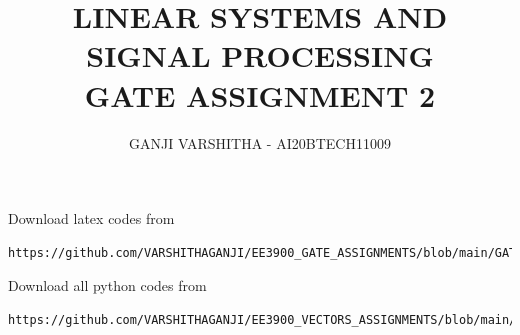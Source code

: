 \documentclass[journal,12pt,twocolumn]{IEEEtran}
\begin{document}
\let\vec\mathbf
\renewcommand{\thefigure}{\theproblem}
\def\putbox#1#2#3{\makebox[0in][l]{\makebox[#1][l]{}\raisebox{\baselineskip}[0in][0in]{\raisebox{#2}[0in][0in]{#3}}}}
     \def\rightbox#1{\makebox[0in][r]{#1}}
     \def\centbox#1{\makebox[0in]{#1}}
     \def\topbox#1{\raisebox{-\baselineskip}[0in][0in]{#1}}
     \def\midbox#1{\raisebox{-0.5\baselineskip}[0in][0in]{#1}}
\vspace{3cm}
\title{\textbf{LINEAR SYSTEMS AND SIGNAL PROCESSING \\ GATE ASSIGNMENT 2}}
\author{GANJI VARSHITHA - AI20BTECH11009}
\maketitle
\newpage
\bigskip
\renewcommand{\thefigure}{\arabic{figure}}
\renewcommand{\thetable}{\arabic{table}}
Download latex codes from 
%
\begin{lstlisting}
https://github.com/VARSHITHAGANJI/EE3900_GATE_ASSIGNMENTS/blob/main/GATE_ASSIGNMENT2/GATE_ASSIGNMENT2.tex
\end{lstlisting}
Download all python codes from
\begin{lstlisting}
https://github.com/VARSHITHAGANJI/EE3900_VECTORS_ASSIGNMENTS/blob/main/GATE_ASSIGNMENT2/code_graphs.py
\end{lstlisting}
\end{document}
